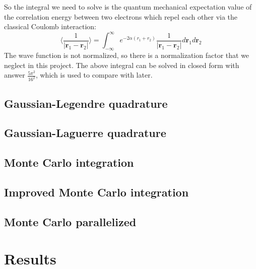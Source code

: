 \documentclass[12pt,a4paper,english]{article}
\begin{document}
So the integral we need to solve is the quantum mechanical expectation value of the correlation energy between two electrons which repel each other via the classical Coulomb interaction:
\begin{equation}
\langle\frac{1}{|\textbf{r}_1-\textbf{r}_2|}\rangle=\int_{-\infty}^{\infty}e^{-2\alpha(r_1+r_2)}\frac{1}{|\textbf{r}_1-\textbf{r}_2|}d\textbf{r}_1d\textbf{r}_2
\end{equation}
The wave function is not normalized, so there is a normalization factor that we neglect in this project. The above integral can be solved in closed form with answer $\frac{5\pi^2}{16^2}$, which is used to compare with later.

\subsection{Gaussian-Legendre quadrature}
\subsection{Gaussian-Laguerre quadrature}
\subsection{Monte Carlo integration}
\subsection{Improved Monte Carlo integration}
\subsection{Monte Carlo parallelized}
\section{Results}
\end{document}
